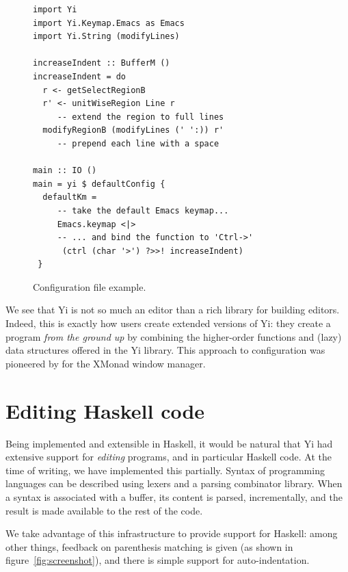 \documentclass[9pt,indentedstyle]{sigplanconf}
\begin{document}
\begin{figure}
\begin{verbatim}
import Yi
import Yi.Keymap.Emacs as Emacs
import Yi.String (modifyLines)

increaseIndent :: BufferM ()
increaseIndent = do
  r <- getSelectRegionB 
  r' <- unitWiseRegion Line r 
     -- extend the region to full lines
  modifyRegionB (modifyLines (' ':)) r'
     -- prepend each line with a space
                                     
main :: IO ()
main = yi $ defaultConfig {
  defaultKm = 
     -- take the default Emacs keymap...
     Emacs.keymap <|> 
     -- ... and bind the function to 'Ctrl->'
      (ctrl (char '>') ?>>! increaseIndent)
 }
\end{verbatim}
\caption{Configuration file example.}
\label{fig:example}
\end{figure}

We see that Yi is not so much an editor than a rich library for
building editors. Indeed, this is exactly how users create extended
versions of Yi: they create a program {\em from the ground up} by
combining the higher-order functions and (lazy) data structures
offered in the Yi library. This approach to configuration was
pioneered by \citet{Stewart2007XMonad} for the XMonad window manager.

\section{Editing Haskell code}

Being implemented and extensible in Haskell, it would be natural that
Yi had extensive support for \emph{editing} programs, and in
particular Haskell code.  At the time of writing, we have implemented
this partially. Syntax of programming languages can be described
using lexers and a parsing combinator library. When a syntax is
associated with a buffer, its content is parsed, incrementally,
and the result is made available to the rest of the code.

We take advantage of this infrastructure to provide support for
Haskell: among other things, feedback on parenthesis matching is given
(as shown in figure~\ref{fig:screenshot}), and there is simple support
for auto-indentation.
\end{document}
